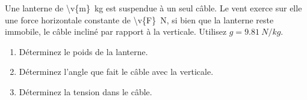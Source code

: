 Une lanterne de \qty{\v{m}}{kg} est suspendue à un seul câble. Le vent exerce sur elle une force horizontale constante de \qty{\v{F}}{N}, si bien que la lanterne reste immobile, le câble incliné par rapport à la verticale. Utilisez $g = \qty{9.81}{N/kg}$.

\begin{enumerate}[label=\alph*)]
    \item Déterminez le poids de la lanterne.
    \item Déterminez l'angle que fait le câble avec la verticale.
    \item Déterminez la tension dans le câble.
\end{enumerate}
